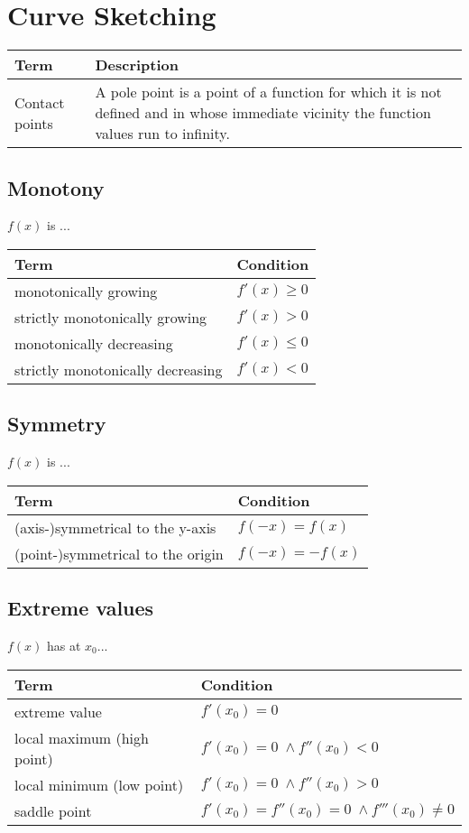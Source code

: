 \documentclass{book}
\begin{document}
\section{Curve Sketching}

\begin{tabular}{p{3cm}p{10.5cm}}
  \toprule
  \textbf{Term} & \textbf{Description} \\
  \midrule
  Contact points & A pole point is a point of a function for which it is not defined and in whose immediate vicinity the function values run to infinity.\\
  \bottomrule
\end{tabular}

\subsection{Monotony}
$f(x)$ is ...

\begin{tabular}{p{6cm}p{7.5cm}}
  \toprule
  \textbf{Term} & \textbf{Condition} \\
  \midrule
  monotonically growing & $f'(x) \ge 0$\\
  \midrule
  strictly monotonically growing & $f'(x) > 0$\\
  \midrule
  monotonically decreasing & $f'(x) \le 0$\\
  \midrule
  strictly monotonically decreasing & $f'(x) <0$\\
  \bottomrule
\end{tabular}

\subsection{Symmetry}
$f(x)$ is ...

\begin{tabular}{p{6cm}p{7.5cm}}
  \toprule
  \textbf{Term} & \textbf{Condition} \\
  \midrule
  (axis-)symmetrical to the y-axis & $f(-x) = f(x)$\\
  \midrule
  (point-)symmetrical to the origin & $f(-x) = -f(x)$\\
  \bottomrule
\end{tabular}

\subsection{Extreme values}
$f(x)$ has at $x_0$...

\begin{tabular}{p{6cm}p{7.5cm}}
  \toprule
  \textbf{Term} & \textbf{Condition} \\
  \midrule
  extreme value & $f'(x_0) = 0$\\
  \midrule
  local maximum (high point)& $f'(x_0) = 0 \;\land f''(x_0)<0$\\
  \midrule
  local minimum (low point)& $f'(x_0) = 0 \;\land f''(x_0)>0$\\
  \midrule
  saddle point & $f'(x_0) = f''(x_0) = 0 \;\land f'''(x_0)\ne0$\\
  \bottomrule
\end{tabular}
\end{document}
